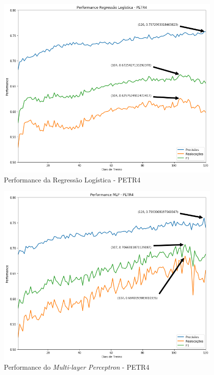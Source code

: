 \documentclass[grad,numbers]{coppe}
\begin{document}
            \begin{figure}[h!]
                \caption{Performance da Regressão Logística - PETR4}
                \label{img:performance-logreg}
                \includegraphics[width=13.1cm]{performance-logreg.png}
                \centering
            \end{figure}
            
            \begin{figure}[h!]
                \caption{Performance do \textit{Multi-layer Perceptron} - PETR4}
                \label{img:performance-mlp}
                \includegraphics[width=13.1cm]{mlp-performance.png}
                \centering
            \end{figure}
            
\end{document}
